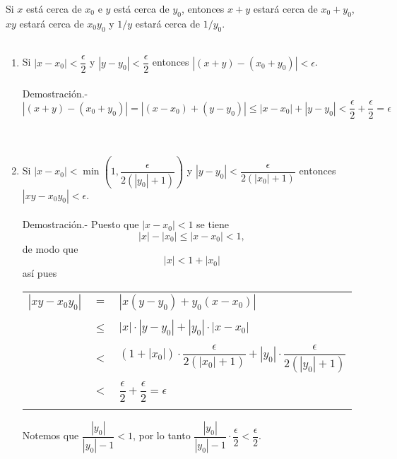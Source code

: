     \begin{lema}
	Si $x$ está cerca de $x_0$ e $y$ está cerca de $y_0$, entonces $x+y$ estará cerca de $x_0 + y_0$, $xy$ estará cerca de $x_0y_0$ y $1/y$ estará cerca de $1/y_0$.\\\\
	\begin{enumerate}[\bfseries (1)]

	    \item Si $|x-x_0|<\dfrac{\epsilon}{2}$ y $|y-y_0|<\dfrac{\epsilon}{2}$ \; entonces \; $|(x+y) - (x_0+y_0)|<\epsilon$.\\\\
		Demostración.-\;$$|(x+y)-(x_0+y_0)| = |(x-x_0)+(y-y_0)| \leq |x-x_0| + |y-y_0| < \dfrac{\epsilon}{2} + \dfrac{\epsilon}{2} = \epsilon$$\\\\

	    \item Si $|x-x_0| < \min\left(1,\dfrac{\epsilon}{2(|y_0|+1)}\right)$ \; y\; $|y-y_0| < \dfrac{\epsilon}{2(|x_0| + 1)}$\; entonces \;$|xy-x_0y_0|<\epsilon$.\\\\
		Demostración.-\; Puesto que $|x-x_0|<1$ se tiene $$|x| - |x_0| \leq |x-x_0|<1,$$
		de modo que $$|x| < 1 + |x_0|$$ así pues 
		\begin{center}
		    \begin{tabular}{rcl}
			$|xy-x_0y_0|$&$=$&$|x(y-y_0) + y_0(x-x_0)|$\\\\
			&$\leq$&$|x|\cdot |y-y_0| + |y_0|\cdot |x-x_0|$\\\\
			&$<$&$(1+|x_0|)\cdot \dfrac{\epsilon}{2(|x_0|+1)} + |y_0|\cdot \dfrac{\epsilon}{2(|y_0|+1)}$\\\\
			&$<$&$\dfrac{\epsilon}{2} + \dfrac{\epsilon}{2} = \epsilon$\\\\
		    \end{tabular}
		\end{center}
		Notemos que $\dfrac{|y_0|}{|y_0|-1}<1$, por lo tanto $\dfrac{|y_0|}{|y_0|-1}\cdot \dfrac{\epsilon}{2}< \dfrac{\epsilon}{2}$.\\\\
		\vspace{.5cm}


\end{enumerate}
\end{lema}
